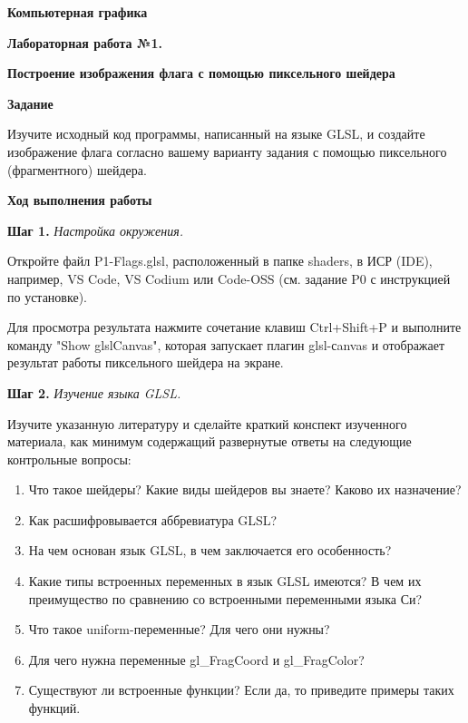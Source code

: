 \documentclass[a4paper,12pt]{article}
\theoremstyle{plain}
\begin{document}
    \begin{center}
    \textbf{{\Large Компьютерная графика}}
    
    \textbf{{\large Лабораторная работа №1. }}
    
    \textbf{{\large Построение изображения флага с помощью пиксельного шейдера}}
    \end{center}
    
    
    \textbf{Задание}
    
    Изучите исходный код программы, написанный на языке GLSL, и создайте изображение флага согласно вашему варианту задания с помощью пиксельного (фрагментного) шейдера.
        
    \textbf{Ход выполнения работы}
    
    \textbf{Шаг 1. }\textit{Настройка окружения.} 
        
    Откройте файл P1-Flags.glsl, расположенный в папке shaders, в ИСР (IDE), например, VS Code, VS Codium или Code-OSS (см. задание P0 с инструкцией по установке). 
    
    Для просмотра результата нажмите сочетание клавиш Ctrl+Shift+P и выполните команду "Show glslCanvas", которая запускает плагин glsl-сanvas и отображает результат работы пиксельного шейдера на экране.
    
    \textbf{Шаг 2.} \textit{Изучение языка GLSL.} 
    
    Изучите указанную литературу и сделайте краткий конспект изученного материала, как минимум содержащий развернутые ответы на следующие контрольные вопросы:
    \begin{enumerate}
    \item Что такое шейдеры? Какие виды шейдеров вы знаете? Каково их назначение?
    \item Как расшифровывается аббревиатура GLSL?
    \item На чем основан язык GLSL, в чем заключается его особенность?
    \item Какие типы встроенных переменных в язык GLSL имеются? В чем их преимущество по сравнению со встроенными переменными языка Си?
    \item Что такое uniform-переменные? Для чего они нужны?
    \item Для чего нужна переменные gl\_FragCoord и gl\_FragColor?
    \item Существуют ли встроенные функции? Если да, то приведите примеры таких функций.
    \end{enumerate}
    
\end{document}
